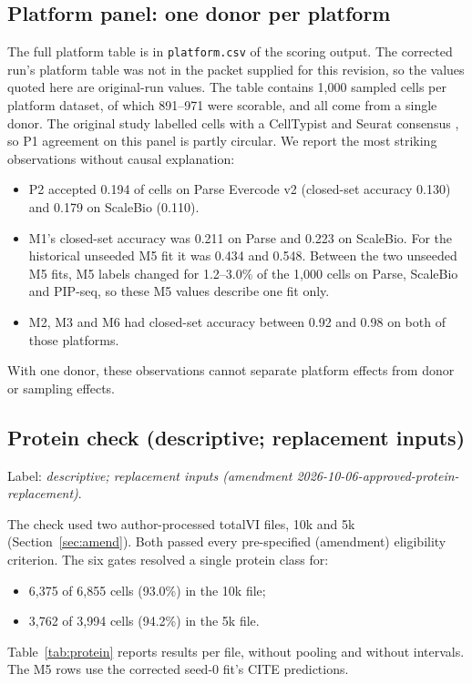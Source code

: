 \documentclass[11pt]{article}
\begin{document}
\subsection{Platform panel: one donor per platform}

The full platform table is in \nolinkurl{platform.csv} of the scoring output. The corrected run's platform table was not in the packet supplied for this revision, so the values quoted here are original-run values. The table contains 1{,}000 sampled cells per platform dataset, of which 891--971 were scorable, and all come from a single donor. The original study labelled cells with a CellTypist and Seurat consensus \citep{desimone2025platforms}, so P1 agreement on this panel is partly circular. We report the most striking observations without causal explanation:
\begin{itemize}
\item P2 accepted 0.194 of cells on Parse Evercode v2 (closed-set accuracy 0.130) and 0.179 on ScaleBio (0.110).
\item M1's closed-set accuracy was 0.211 on Parse and 0.223 on ScaleBio. For the historical unseeded M5 fit it was 0.434 and 0.548. Between the two unseeded M5 fits, M5 labels changed for 1.2--3.0\% of the 1{,}000 cells on Parse, ScaleBio and PIP-seq, so these M5 values describe one fit only.
\item M2, M3 and M6 had closed-set accuracy between 0.92 and 0.98 on both of those platforms.
\end{itemize}
With one donor, these observations cannot separate platform effects from donor or sampling effects.

\subsection{Protein check (descriptive; replacement inputs)}

Label: \emph{descriptive; replacement inputs (amendment 2026-10-06-approved-protein-replacement)}.

The check used two author-processed totalVI files, 10k and 5k (Section~\ref{sec:amend}). Both passed every pre-specified (amendment) eligibility criterion. The six gates resolved a single protein class for:
\begin{itemize}
\item 6{,}375 of 6{,}855 cells (93.0\%) in the 10k file;
\item 3{,}762 of 3{,}994 cells (94.2\%) in the 5k file.
\end{itemize}
Table~\ref{tab:protein} reports results per file, without pooling and without intervals. The M5 rows use the corrected seed-0 fit's CITE predictions.
\end{document}
